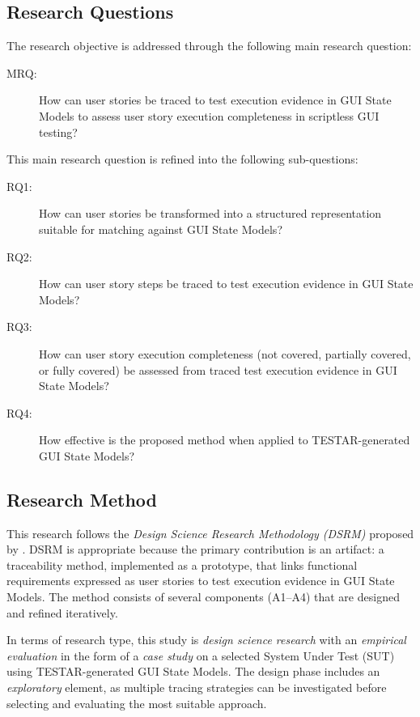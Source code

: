 \documentclass{ou-report-vaf}
\begin{document}
\subsection{Research Questions}
\label{subsec:research-questions}

The research objective is addressed through the following main research question:

\begin{description}
    \item[MRQ:]
    How can user stories be traced to test execution evidence in GUI State Models to assess user story execution completeness in scriptless GUI testing?
\end{description}

This main research question is refined into the following sub-questions:

\begin{description}
    \item[RQ1:]
    How can user stories be transformed into a structured representation suitable for matching against GUI State Models?
    
    \item[RQ2:]
    How can user story steps be traced to test execution evidence in GUI State Models?
    
    \item[RQ3:]
    How can user story execution completeness (not covered, partially covered, or fully covered) be assessed from traced test execution evidence in GUI State Models?
    
    \item[RQ4:]
    How effective is the proposed method when applied to TESTAR-generated GUI State Models?
\end{description}

\subsection{Research Method}
\label{subsec:research-method}

This research follows the \emph{Design Science Research Methodology (DSRM)} proposed by \citet{peffers2007design}. DSRM is appropriate because the primary contribution is an artifact: a traceability method, implemented as a prototype, that links functional requirements expressed as user stories to test execution evidence in GUI State Models. The method consists of several components (A1--A4) that are designed and refined iteratively.

In terms of research type, this study is \emph{design science research} with an \emph{empirical evaluation} in the form of a \emph{case study} on a selected System Under Test (SUT) using TESTAR-generated GUI State Models. The design phase includes an \emph{exploratory} element, as multiple tracing strategies can be investigated before selecting and evaluating the most suitable approach.
\end{document}
